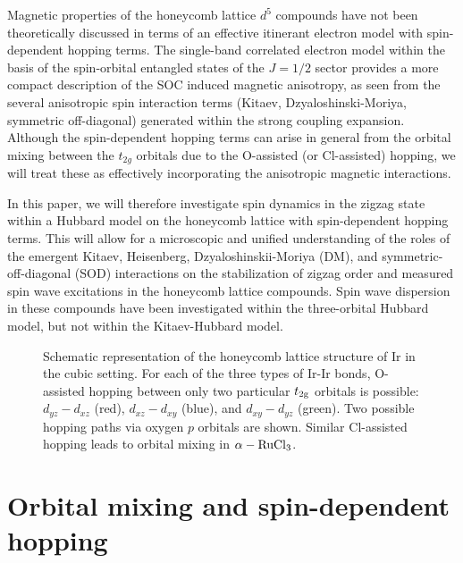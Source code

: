 \documentclass[aps,prb,fleqn,12pt,amsmath,amssymb]{revtex4}
\begin{document}
Magnetic properties of the honeycomb lattice $d^5$ compounds have not been theoretically discussed in terms of an effective itinerant electron model with spin-dependent hopping terms. The single-band correlated electron model within the basis of the spin-orbital entangled states of the $J=1/2$ sector provides a more compact description of the SOC induced magnetic anisotropy, as seen from the several anisotropic spin interaction terms (Kitaev, Dzyaloshinski-Moriya, symmetric off-diagonal) generated within the strong coupling expansion. Although the spin-dependent hopping terms can arise in general from the orbital mixing between the $t_{2g}$ orbitals due to the O-assisted (or Cl-assisted) hopping, we will treat these as effectively incorporating the anisotropic magnetic interactions.

In this paper, we will therefore investigate spin dynamics in the zigzag state within a Hubbard model on the honeycomb lattice with spin-dependent hopping terms. This will allow for a microscopic and unified understanding of the roles of the emergent Kitaev, Heisenberg, Dzyaloshinskii-Moriya (DM), and symmetric-off-diagonal (SOD) interactions on the stabilization of zigzag order and measured spin wave excitations in the honeycomb lattice compounds. Spin wave dispersion in these compounds have been investigated within the three-orbital Hubbard model,\cite{igarashi_JESRP_2016} but not within the Kitaev-Hubbard model.\cite{liang_PRB_2014}  

\begin{figure}
\vspace*{0mm}
\hspace*{0mm}
 \hspace*{10mm}
\caption{Schematic representation of the honeycomb lattice structure of Ir in the cubic setting. For each of the three types of Ir-Ir bonds, O-assisted hopping between only two particular $t_{\rm 2g}$ orbitals is possible: $d_{yz} - d_{xz}$ (red), $d_{xz} - d_{xy}$ (blue), and $d_{xy} - d_{yz}$ (green). Two possible hopping paths via oxygen $p$ orbitals are shown. Similar Cl-assisted hopping leads to orbital mixing in $\rm \alpha - Ru Cl_3$.} 
\label{hc_embedding}
\end{figure}

\section{Orbital mixing and spin-dependent hopping}
\end{document}
